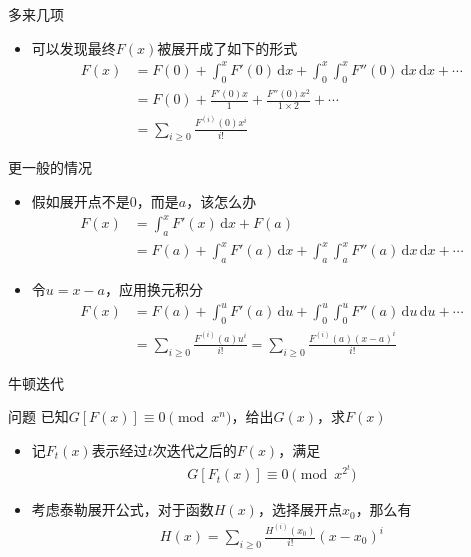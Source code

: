 \documentclass{beamer}
\begin{document}
\begin{frame}{多来几项}
    \begin{itemize}
        \item 可以发现最终$F(x)$被展开成了如下的形式 \pause
        $$\begin{aligned}
            F(x) &= F(0) + \int_{0}^x F'(0) \,\mathrm{d}x + \int_{0}^x \int_{0}^x F''(0) \,\mathrm{d}x\,\mathrm{d}x + \cdots\\
            &= F(0) + \frac{F'(0)x}{1} + \frac{F''(0)x^2}{1\times 2} + \cdots\\
            &= \sum_{i\geq 0} \frac{F^{(i)}(0)x^i}{i!}
        \end{aligned}$$
    \end{itemize}
\end{frame}

\begin{frame}{更一般的情况}
    \begin{itemize}
        \item 假如展开点不是$0$，而是$a$，该怎么办 \pause
        $$\begin{aligned}
            F(x) &= \int_{a}^x F'(x) \,\mathrm{d}x + F(a)\\
            &= F(a) + \int_{a}^x F'(a) \,\mathrm{d}x + \int_{a}^x \int_{a}^x F''(a) \,\mathrm{d}x \,\mathrm{d}x + \cdots
        \end{aligned}$$ \pause
        \item 令$u = x - a$，应用换元积分 \pause
        $$\begin{aligned}
            F(x) &= F(a) + \int_{0}^{u} F'(a) \,\mathrm{d}u + \int_{0}^{u} \int_{0}^{u} F''(a) \,\mathrm{d}u \,\mathrm{d}u + \cdots\\
            &= \sum_{i\geq 0} \frac{F^{(i)}(a)u^i}{i!} = \sum_{i\geq 0} \frac{F^{(i)}(a)(x - a)^i}{i!}
        \end{aligned}$$
    \end{itemize}
\end{frame}

\begin{frame}{牛顿迭代}
    \begin{block}{问题}
        已知$G[F(x)] \equiv 0\pmod {x^n}$，给出$G(x)$，求$F(x)$
    \end{block} \pause
    \begin{itemize}
        \item 记$F_t(x)$表示经过$t$次迭代之后的$F(x)$，满足
        $$\begin{aligned}
            G[F_t(x)] \equiv 0\pmod{x^{2^t}}
        \end{aligned}$$ \pause
        \item 考虑泰勒展开公式，对于函数$H(x)$，选择展开点$x_0$，那么有
        $$\begin{aligned}
            H(x) = \sum_{i\geq 0}\frac{H^{(i)}(x_0)}{i!}(x - x_0)^i
        \end{aligned}$$
    \end{itemize}
\end{frame}
\end{document}

